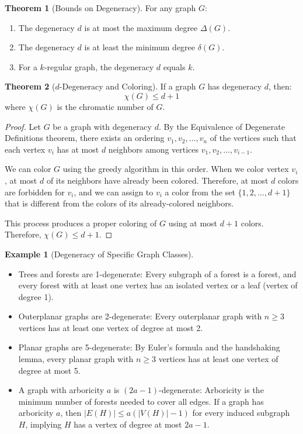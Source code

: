 \documentclass{article}
\theoremstyle{definition}
\newtheorem{example}{Example}
\newtheorem{theorem}{Theorem}
\begin{document}
\begin{theorem}[Bounds on Degeneracy]
For any graph $G$:
\begin{enumerate}
    \item The degeneracy $d$ is at most the maximum degree $\Delta(G)$.
    \item The degeneracy $d$ is at least the minimum degree $\delta(G)$.
    \item For a $k$-regular graph, the degeneracy $d$ equals $k$.
\end{enumerate}
\end{theorem}

\begin{theorem}[$d$-Degeneracy and Coloring]
If a graph $G$ has degeneracy $d$, then:
\begin{equation}
\chi(G) \leq d + 1
\end{equation}
where $\chi(G)$ is the chromatic number of $G$.
\end{theorem}

\begin{proof}
Let $G$ be a graph with degeneracy $d$. By the Equivalence of Degenerate Definitions theorem, there exists an ordering $v_1, v_2, \ldots, v_n$ of the vertices such that each vertex $v_i$ has at most $d$ neighbors among vertices $v_1, v_2, \ldots, v_{i-1}$.

We can color $G$ using the greedy algorithm in this order. When we color vertex $v_i$, at most $d$ of its neighbors have already been colored. Therefore, at most $d$ colors are forbidden for $v_i$, and we can assign to $v_i$ a color from the set $\{1, 2, \ldots, d+1\}$ that is different from the colors of its already-colored neighbors.

This process produces a proper coloring of $G$ using at most $d+1$ colors. Therefore, $\chi(G) \leq d + 1$.
\end{proof}

\begin{example}[Degeneracy of Specific Graph Classes]
\begin{itemize}
    \item Trees and forests are 1-degenerate: Every subgraph of a forest is a forest, and every forest with at least one vertex has an isolated vertex or a leaf (vertex of degree 1).
    
    \item Outerplanar graphs are 2-degenerate: Every outerplanar graph with $n \geq 3$ vertices has at least one vertex of degree at most 2.
    
    \item Planar graphs are 5-degenerate: By Euler's formula and the handshaking lemma, every planar graph with $n \geq 3$ vertices has at least one vertex of degree at most 5.
    
    \item A graph with arboricity $a$ is $(2a-1)$-degenerate: Arboricity is the minimum number of forests needed to cover all edges. If a graph has arboricity $a$, then $|E(H)| \leq a(|V(H)|-1)$ for every induced subgraph $H$, implying $H$ has a vertex of degree at most $2a-1$.
\end{itemize}
\end{example}
\end{document}
